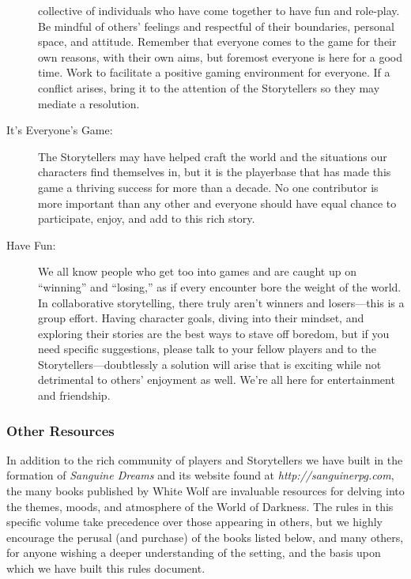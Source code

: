 \begin{description}
	collective of individuals who have come together to have fun and role-play.  Be mindful of 
	others' feelings and respectful of their boundaries, personal space, and attitude.  Remember 
	that everyone comes to the game for their own reasons, with their own aims, but foremost everyone 
	is here for a good time.  Work to facilitate a positive gaming environment for everyone.  If a 
	conflict arises, bring it to the attention of the Storytellers so they may mediate a resolution.
	\item[It's Everyone's Game:] The Storytellers may have helped craft the world and the 
	situations our characters find themselves in, but it is the playerbase that has made this game 
	a thriving success for more than a decade.  No one contributor is more important than any other 
	and everyone should have equal chance to participate, enjoy, and add to this rich story.
	\item[Have Fun:] We all know people who get too into games and are caught up on ``winning'' 
	and ``losing,'' as if every encounter bore the weight of the world.  In collaborative 
	storytelling, there truly aren't winners and losers---this is a group effort.  Having character 
	goals, diving into their mindset, and exploring their stories are the best ways to stave off 
	boredom, but if you need specific suggestions, please talk to your fellow players and to the 
	Storytellers---doubtlessly a solution will arise that is exciting while not detrimental to others' 
	enjoyment as well.  We're all here for entertainment and friendship.
\end{description}

\subsubsection{Other Resources}
In addition to the rich community of players and Storytellers we have built in the formation of 
\emph{Sanguine Dreams} and its website found at \emph{http://sanguinerpg.com}, the many books published 
by White Wolf are invaluable resources for delving into the themes, moods, and atmosphere of the 
World of Darkness.  The rules in this specific volume take precedence over those appearing in others, 
but we highly encourage the perusal (and purchase) of the books listed below, and many others, for 
anyone wishing a deeper understanding of the setting, and the basis upon which we have built this rules 
document.

